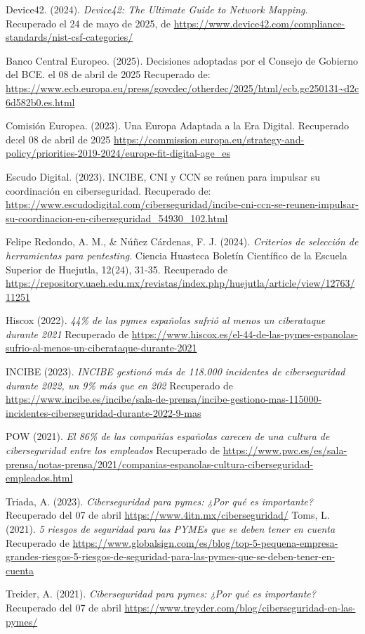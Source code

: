 \documentclass[a4paper, 10pt]{article}
\begin{document}
\begin{thebibliography}{20}
    Device42. (2024). \textit{Device42: The Ultimate Guide to Network Mapping}. Recuperado el 24 de mayo de 2025, de \url{https://www.device42.com/compliance-standards/nist-csf-categories/}

    Banco Central Europeo. (2025). Decisiones adoptadas por el Consejo de Gobierno del BCE. el 08 de abril de 2025 Recuperado de: \url{https://www.ecb.europa.eu/press/govcdec/otherdec/2025/html/ecb.gc250131~d2c6d582b0.es.html}

    Comisión Europea. (2023). Una Europa Adaptada a la Era Digital. Recuperado de:el 08 de abril de 2025  \url{https://commission.europa.eu/strategy-and-policy/priorities-2019-2024/europe-fit-digital-age_es}

    Escudo Digital. (2023). INCIBE, CNI y CCN se reúnen para impulsar su coordinación en ciberseguridad. Recuperado de: \url{https://www.escudodigital.com/ciberseguridad/incibe-cni-ccn-se-reunen-impulsar-su-coordinacion-en-ciberseguridad_54930_102.html}

    Felipe Redondo, A. M., \& Núñez Cárdenas, F. J. (2024). \textit{Criterios de selección de herramientas para pentesting}. Ciencia Huasteca Boletín Científico de la Escuela Superior de Huejutla, 12(24), 31-35. Recuperado de \url{https://repository.uaeh.edu.mx/revistas/index.php/huejutla/article/view/12763/11251}
    
    Hiscox (2022). \textit{ 44\% de las pymes españolas sufrió al menos un ciberataque durante 2021} Recuperado de \url{https://www.hiscox.es/el-44-de-las-pymes-espanolas-sufrio-al-menos-un-ciberataque-durante-2021}

    INCIBE (2023). \textit{INCIBE gestionó más de 118.000 incidentes de ciberseguridad durante 2022, un 9\% más que en 202} Recuperado de \url{https://www.incibe.es/incibe/sala-de-prensa/incibe-gestiono-mas-115000-incidentes-ciberseguridad-durante-2022-9-mas}

    POW (2021). \textit{El 86\% de las compañías españolas carecen de una cultura de ciberseguridad entre los empleados} Recuperado de \url{https://www.pwc.es/es/sala-prensa/notas-prensa/2021/companias-espanolas-cultura-ciberseguridad-empleados.html}


    Triada, A. (2023). \textit{Ciberseguridad para pymes: ¿Por qué es importante?} Recuperado del 07 de abril \url{https://www.4itn.mx/ciberseguridad/}
    Toms, L. (2021). \textit{5 riesgos de seguridad para las PYMEs que se deben tener en cuenta} Recuperado de \url{https://www.globalsign.com/es/blog/top-5-pequena-empresa-grandes-riesgos-5-riesgos-de-seguridad-para-las-pymes-que-se-deben-tener-en-cuenta}
    
    Treider, A. (2021). \textit{Ciberseguridad para pymes: ¿Por qué es importante?} Recuperado del 07 de abril \url{https://www.treyder.com/blog/ciberseguridad-en-las-pymes/}
\end{thebibliography}
\end{document}
